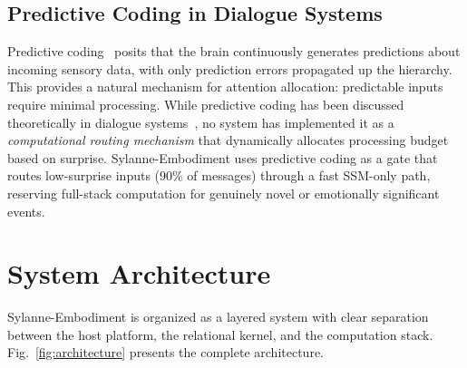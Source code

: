\documentclass[10pt,twocolumn]{article}
\begin{document}
\subsection{Predictive Coding in Dialogue Systems}

Predictive coding~\cite{rao1999predictive,clark2013whatever} posits that the brain continuously generates predictions about incoming sensory data, with only prediction errors propagated up the hierarchy. This provides a natural mechanism for attention allocation: predictable inputs require minimal processing. While predictive coding has been discussed theoretically in dialogue systems~\cite{colombo2024affective_ai}, no system has implemented it as a \emph{computational routing mechanism} that dynamically allocates processing budget based on surprise. Sylanne-Embodiment uses predictive coding as a gate that routes low-surprise inputs (90\% of messages) through a fast SSM-only path, reserving full-stack computation for genuinely novel or emotionally significant events.

\section{System Architecture}
\label{sec:architecture}

Sylanne-Embodiment is organized as a layered system with clear separation between the host platform, the relational kernel, and the computation stack. Fig.~\ref{fig:architecture} presents the complete architecture.
\end{document}
